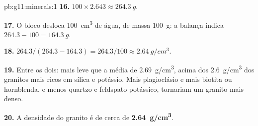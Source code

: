 \begin{solution}{pb:g11:minerals:1}
\textbf{16.} $100 \times 2.643 \approx \qty{264.3}{g}$.

\textbf{17.} O bloco desloca \qty{100}{cm^3} de água, de massa
\qty{100}{g}: a balança indica $264.3 - 100 = \qty{164.3}{g}$.

\textbf{18.} $264.3/(264.3 - 164.3) = 264.3/100 \approx \qty{2.64}{g/cm^3}$.

\textbf{19.} Entre os dois: mais leve que a média de \qty{2.69}{g/cm^3},
acima dos \qty{2.6}{g/cm^3} dos granitos mais ricos em sílica e potássio.
Mais plagioclásio e mais biotita ou hornblenda, e menos quartzo e feldspato
potássico, tornariam um granito mais denso.

\textbf{20.} A densidade do granito é de cerca de
\textbf{\qty{2.64}{g/cm^3}}.
\end{solution}
